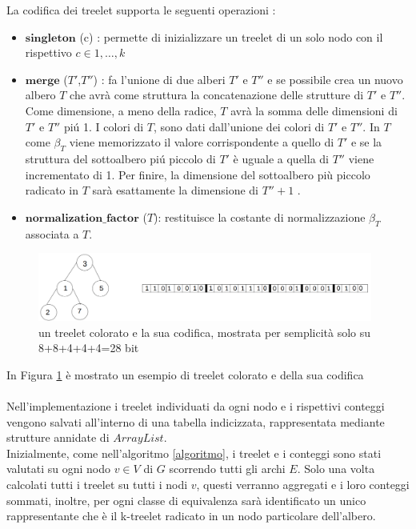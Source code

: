 La codifica dei treelet supporta le seguenti operazioni :
\begin{itemize}
	\item $ \textbf{singleton} $ (c) : permette di inizializzare un treelet di un solo nodo con il rispettivo $ c \in {1, \dots, k} $
	\item $ \textbf{merge} $ ($ T' $,$ T'' $) : fa l'unione di due alberi $ T' $ e $ T'' $ e se possibile crea un nuovo albero $ T $ che avr\`a come struttura la concatenazione delle strutture di $ T' $ e $ T'' $.
	Come dimensione, a meno della radice, $ T $ avr\`a la somma delle dimensioni di $ T' $ e $ T'' $ pi\'u 1.
	I colori di $ T $, sono dati dall'unione dei colori di $ T' $ e $ T'' $.
	In $ T $ come $ \beta_T $ viene memorizzato il valore corrispondente a quello di $ T' $ e se la struttura del sottoalbero pi\'u piccolo di $ T' $ \`e uguale a quella di $ T'' $ viene incrementato di 1. Per finire, la dimensione del sottoalbero pi\`u piccolo radicato in $ T $ sar\`a esattamente la dimensione di $ T''+1  $ .
	\item $\textbf{normalization\_factor}$ ($ T $): restituisce la costante di normalizzazione $ \beta_T $ associata a $ T $.
	    
\end{itemize}
\begin{figure}[htbp]
	\centering
	\includegraphics[width=11cm]{capitolo2/grafo4}
	\caption{un treelet colorato e la sua codifica, mostrata per semplicit\`a solo su 8+8+4+4+4=28 bit}
	\label{figura1}
\end{figure}
 In Figura \ref{figura1} \`e mostrato un esempio di treelet colorato e della sua codifica\\\\
Nell'implementazione i treelet individuati da ogni nodo e i rispettivi conteggi vengono salvati all'interno di una tabella indicizzata, rappresentata mediante strutture annidate di $ ArrayList $.\\
Inizialmente, come nell'algoritmo \ref{algoritmo}, i treelet e i conteggi sono stati valutati su ogni nodo $ v \in V $ di $ G $ scorrendo tutti gli archi $ E $.
Solo una volta calcolati  tutti i treelet su tutti i nodi $ v $, questi verranno aggregati e i loro conteggi sommati, inoltre, per ogni classe di equivalenza sar\`a identificato un unico rappresentante che \`e il k-treelet radicato in un nodo particolare dell'albero.
